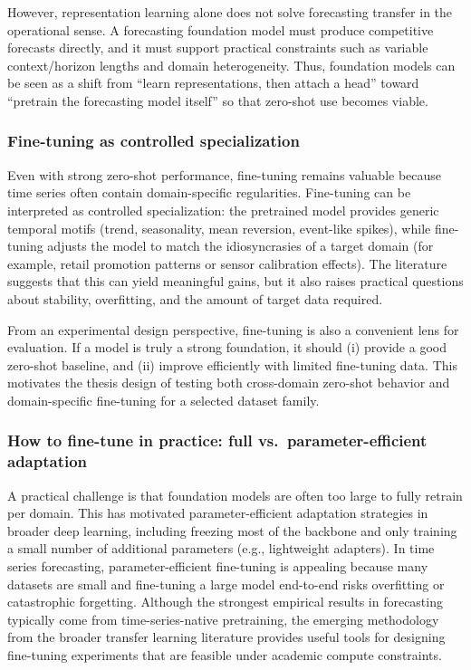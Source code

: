 However, representation learning alone does not solve forecasting transfer in the operational sense. A forecasting foundation model must produce competitive forecasts directly, and it must support practical constraints such as variable context/horizon lengths and domain heterogeneity. Thus, foundation models can be seen as a shift from ``learn representations, then attach a head'' toward ``pretrain the forecasting model itself'' so that zero-shot use becomes viable.

\subsubsection{Fine-tuning as controlled specialization}
Even with strong zero-shot performance, fine-tuning remains valuable because time series often contain domain-specific regularities. Fine-tuning can be interpreted as controlled specialization: the pretrained model provides generic temporal motifs (trend, seasonality, mean reversion, event-like spikes), while fine-tuning adjusts the model to match the idiosyncrasies of a target domain (for example, retail promotion patterns or sensor calibration effects). The literature suggests that this can yield meaningful gains, but it also raises practical questions about stability, overfitting, and the amount of target data required.

From an experimental design perspective, fine-tuning is also a convenient lens for evaluation. If a model is truly a strong foundation, it should (i) provide a good zero-shot baseline, and (ii) improve efficiently with limited fine-tuning data. This motivates the thesis design of testing both cross-domain zero-shot behavior and domain-specific fine-tuning for a selected dataset family.

\subsubsection{How to fine-tune in practice: full vs.\ parameter-efficient adaptation}
A practical challenge is that foundation models are often too large to fully retrain per domain. This has motivated parameter-efficient adaptation strategies in broader deep learning, including freezing most of the backbone and only training a small number of additional parameters (e.g., lightweight adapters). In time series forecasting, parameter-efficient fine-tuning is appealing because many datasets are small and fine-tuning a large model end-to-end risks overfitting or catastrophic forgetting. Although the strongest empirical results in forecasting typically come from time-series-native pretraining, the emerging methodology from the broader transfer learning literature provides useful tools for designing fine-tuning experiments that are feasible under academic compute constraints.

